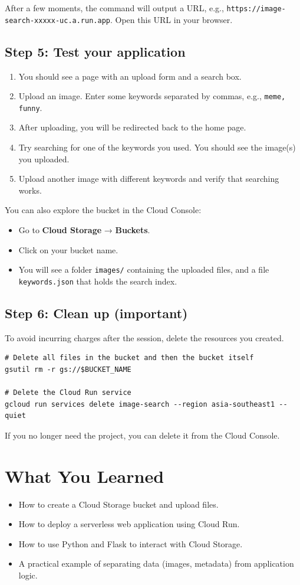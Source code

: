 \documentclass[12pt,a4paper]{article}
\begin{document}
After a few moments, the command will output a URL, e.g., \texttt{https://image-search-xxxxx-uc.a.run.app}. Open this URL in your browser.

\subsection*{Step 5: Test your application}
\begin{enumerate}
    \item You should see a page with an upload form and a search box.
    \item Upload an image. Enter some keywords separated by commas, e.g., \texttt{meme, funny}.
    \item After uploading, you will be redirected back to the home page.
    \item Try searching for one of the keywords you used. You should see the image(s) you uploaded.
    \item Upload another image with different keywords and verify that searching works.
\end{enumerate}

You can also explore the bucket in the Cloud Console:
\begin{itemize}
    \item Go to \textbf{Cloud Storage} → \textbf{Buckets}.
    \item Click on your bucket name.
    \item You will see a folder \texttt{images/} containing the uploaded files, and a file \texttt{keywords.json} that holds the search index.
\end{itemize}

\subsection*{Step 6: Clean up (important)}
To avoid incurring charges after the session, delete the resources you created.
\begin{lstlisting}
# Delete all files in the bucket and then the bucket itself
gsutil rm -r gs://$BUCKET_NAME

# Delete the Cloud Run service
gcloud run services delete image-search --region asia-southeast1 --quiet
\end{lstlisting}
If you no longer need the project, you can delete it from the Cloud Console.

\section{What You Learned}
\begin{itemize}
    \item How to create a Cloud Storage bucket and upload files.
    \item How to deploy a serverless web application using Cloud Run.
    \item How to use Python and Flask to interact with Cloud Storage.
    \item A practical example of separating data (images, metadata) from application logic.
\end{itemize}
\end{document}
